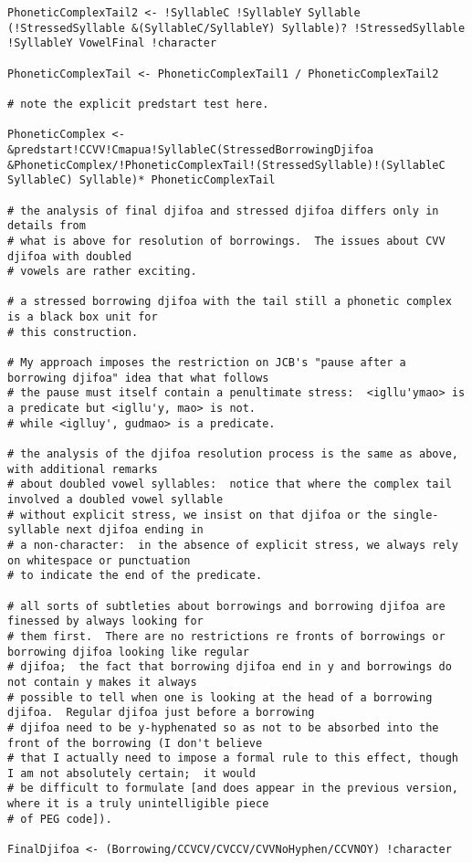 \documentclass[12pt]{book}
\begin{document}
{\begin{verbatim}
PhoneticComplexTail2 <- !SyllableC !SyllableY Syllable (!StressedSyllable &(SyllableC/SyllableY) Syllable)? !StressedSyllable !SyllableY VowelFinal !character

PhoneticComplexTail <- PhoneticComplexTail1 / PhoneticComplexTail2

# note the explicit predstart test here.

PhoneticComplex <- &predstart!CCVV!Cmapua!SyllableC(StressedBorrowingDjifoa &PhoneticComplex/!PhoneticComplexTail!(StressedSyllable)!(SyllableC SyllableC) Syllable)* PhoneticComplexTail

# the analysis of final djifoa and stressed djifoa differs only in details from
# what is above for resolution of borrowings.  The issues about CVV djifoa with doubled
# vowels are rather exciting.

# a stressed borrowing djifoa with the tail still a phonetic complex is a black box unit for
# this construction.

# My approach imposes the restriction on JCB's "pause after a borrowing djifoa" idea that what follows
# the pause must itself contain a penultimate stress:  <igllu'ymao> is a predicate but <igllu'y, mao> is not.
# while <iglluy', gudmao> is a predicate.

# the analysis of the djifoa resolution process is the same as above, with additional remarks
# about doubled vowel syllables:  notice that where the complex tail involved a doubled vowel syllable
# without explicit stress, we insist on that djifoa or the single-syllable next djifoa ending in
# a non-character:  in the absence of explicit stress, we always rely on whitespace or punctuation
# to indicate the end of the predicate.

# all sorts of subtleties about borrowings and borrowing djifoa are finessed by always looking for
# them first.  There are no restrictions re fronts of borrowings or borrowing djifoa looking like regular
# djifoa;  the fact that borrowing djifoa end in y and borrowings do not contain y makes it always
# possible to tell when one is looking at the head of a borrowing djifoa.  Regular djifoa just before a borrowing
# djifoa need to be y-hyphenated so as not to be absorbed into the front of the borrowing (I don't believe
# that I actually need to impose a formal rule to this effect, though I am not absolutely certain;  it would
# be difficult to formulate [and does appear in the previous version, where it is a truly unintelligible piece
# of PEG code]).

FinalDjifoa <- (Borrowing/CCVCV/CVCCV/CVVNoHyphen/CCVNOY) !character


\end{verbatim}}
\end{document}
